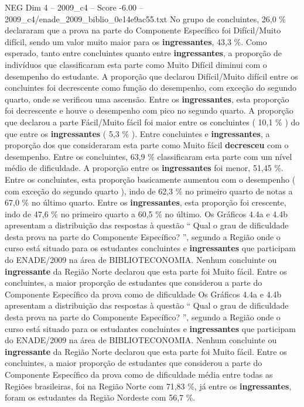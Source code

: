 \begin{textsample}{NEG Dim 4 – 2009\_c4 – Score -6.00 – 2009\_c4/enade\_2009\_biblio\_0e14e9ac55.txt}
No grupo de concluintes, 26,0 \% declararam que a prova na parte do Componente Específico foi Difícil/Muito difícil, sendo um valor muito maior para os \textbf{ingressantes}, 43,3 \%.
Como esperado, tanto entre concluintes quanto entre \textbf{ingressantes}, a proporção de indivíduos que classificaram esta parte como Muito Difícil diminui com o desempenho do estudante.
A proporção que declarou Difícil/Muito difícil entre os concluintes foi decrescente como função do desempenho, com exceção do segundo quarto, onde se verificou uma ascensão.
Entre os \textbf{ingressantes}, esta proporção foi decrescente e houve o desempenho com pico no segundo quarto.
A proporção que declarou a parte Fácil/Muito fácil foi maior entre os concluintes ( 10,1 \% ) do que entre os \textbf{ingressantes} ( 5,3 \% ).
Entre concluintes e \textbf{ingressantes}, a proporção dos que consideraram esta parte como Muito fácil \textbf{decresceu} com o desempenho.
Entre os concluintes, 63,9 \% classificaram esta parte com um nível médio de dificuldade.
A proporção entre os \textbf{ingressantes} foi menor, 51,45 \%.
Entre os concluintes, esta proporção basicamente aumentou com o desempenho ( com exceção do segundo quarto ), indo de 62,3 \% no primeiro quarto de notas a 67,0 \% no último quarto.
Entre os \textbf{ingressantes}, esta proporção foi crescente, indo de 47,6 \% no primeiro quarto a 60,5 \% no último.
Os Gráficos 4.4a e 4.4b apresentam a distribuição das respostas à questão “ Qual o grau de dificuldade desta prova na parte do Componente Específico? ”, segundo a Região onde o curso está situado para os estudantes concluintes e \textbf{ingressantes} que participam do ENADE/2009 na área de BIBLIOTECONOMIA.
Nenhum concluinte ou \textbf{ingressante} da Região Norte declarou que esta parte foi Muito fácil.
Entre os concluintes, a maior proporção de estudantes que considerou a parte do Componente Específico da prova como de dificuldade Os Gráficos 4.4a e 4.4b apresentam a distribuição das respostas à questão “ Qual o grau de dificuldade desta prova na parte do Componente Específico? ”, segundo a Região onde o curso está situado para os estudantes concluintes e \textbf{ingressantes} que participam do ENADE/2009 na área de BIBLIOTECONOMIA.
Nenhum concluinte ou \textbf{ingressante} da Região Norte declarou que esta parte foi Muito fácil.
Entre os concluintes, a maior proporção de estudantes que considerou a parte do Componente Específico da prova como de dificuldade média entre todas as Regiões brasileiras, foi na Região Norte com 71,83 \%, já entre os \textbf{ingressantes}, foram os estudantes da Região Nordeste com 56,7 \%.

\end{textsample}
